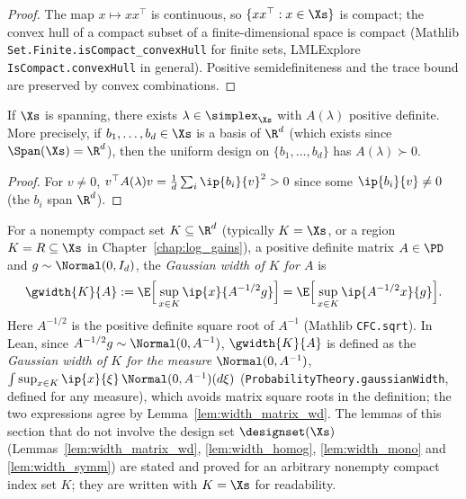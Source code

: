\begin{proof}
\leanok
{}
The map $x \mapsto xx^\top$ is continuous, so $\{xx^\top : x\in\Xs\}$ is compact; the convex
hull of a compact subset of a finite-dimensional space is compact
(Mathlib \texttt{Set.Finite.isCompact\_convexHull} for finite sets, LMLExplore
\texttt{IsCompact.convexHull} in general).
Positive semidefiniteness and the trace bound are preserved by convex combinations.
\end{proof}

\begin{lemma}\label{lem:exists_posdef_design}
\leanok
{}
If $\Xs$ is spanning, there exists $\lambda \in \simplex_{\Xs}$ with $A(\lambda)$ positive
definite. More precisely, if $b_1, \dots, b_d \in \Xs$ is a basis of $\R^d$ (which exists since
$\Span(\Xs) = \R^d$),
then the uniform design on $\{b_1,\dots,b_d\}$ has $A(\lambda) \succ 0$.
\end{lemma}

\begin{proof}
\leanok
{}
For $v \ne 0$, $v^\top A(\lambda) v = \frac1d \sum_i \ip{b_i}{v}^2 > 0$ since some
$\ip{b_i}{v} \neq 0$ (the $b_i$ span $\R^d$).
\end{proof}

\begin{definition}\label{def:width_matrix}
\leanok
{}
For a nonempty compact set $K \subseteq \R^d$ (typically $K = \Xs$, or a region $K = R \subseteq \Xs$
in Chapter~\ref{chap:log_gains}), a positive definite matrix $A \in \PD$ and
$g \sim \Normal(0, I_d)$, the \emph{Gaussian width of $K$ for $A$} is
\[
  \gwidth{K}{A} := \E\Big[ \sup_{x \in K} \ip{x}{A^{-1/2} g} \Big]
  = \E\Big[ \sup_{x \in K} \ip{A^{-1/2}x}{g} \Big].
\]
Here $A^{-1/2}$ is the positive definite square root of $A^{-1}$ (Mathlib \texttt{CFC.sqrt}).
In Lean, since $A^{-1/2}g \sim \Normal(0, A^{-1})$, $\gwidth{K}{A}$ is defined as the
\emph{Gaussian width of $K$ for the measure $\Normal(0, A^{-1})$}, $\int \sup_{x \in K}\ip{x}{\xi}\,\Normal(0,A^{-1})(d\xi)$
(\texttt{ProbabilityTheory.gaussianWidth}, defined for any measure), which avoids matrix square
roots in the definition; the two expressions agree by Lemma~\ref{lem:width_matrix_wd}.
The lemmas of this section that do not involve the design set $\designset(\Xs)$
(Lemmas~\ref{lem:width_matrix_wd}, \ref{lem:width_homog}, \ref{lem:width_mono} and
\ref{lem:width_symm}) are stated and proved for an arbitrary nonempty compact index set $K$;
they are written with $K = \Xs$ for readability.
\end{definition}

